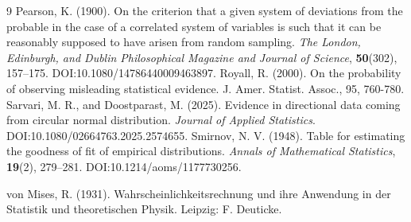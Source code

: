 \documentclass[twoside]{article}
\begin{document}
\begin{thebibliography}{9}
	Pearson, K. (1900).
	On the criterion that a given system of deviations from the probable in the case of a correlated system of variables is such that it can be reasonably supposed to have arisen from random sampling.
	\textit{The London, Edinburgh, and Dublin Philosophical Magazine and Journal of Science}, \textbf{50}(302), 157--175.
	DOI:10.1080/14786440009463897.
 Royall, R. (2000). On the probability of observing misleading statistical evidence. J. Amer. Statist. Assoc., 95, 760-780.
Sarvari, M. R., and Doostparast, M. (2025).
Evidence in directional data coming from circular normal distribution.
\textit{Journal of Applied Statistics}.
DOI:10.1080/02664763.2025.2574655.
	Smirnov, N. V. (1948).
	Table for estimating the goodness of fit of empirical distributions.
	\textit{Annals of Mathematical Statistics}, \textbf{19}(2), 279--281.
	DOI:10.1214/aoms/1177730256.
	
	von Mises, R. (1931).
	Wahrscheinlichkeitsrechnung und ihre Anwendung in der Statistik und theoretischen Physik.
	Leipzig: F. Deuticke.
	
	
	
	

\end{thebibliography}
\end{document}
